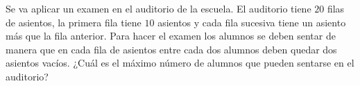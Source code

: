 Se va aplicar un examen en el auditorio de la escuela. El auditorio tiene $20$ filas de asientos, la primera fila tiene $10$ asientos y cada fila sucesiva tiene un asiento más que la fila anterior. Para hacer el examen los alumnos se deben sentar de manera que en cada fila de asientos entre cada dos alumnos deben quedar dos asientos vacíos. ¿Cuál es el máximo número de alumnos que pueden sentarse en el auditorio?